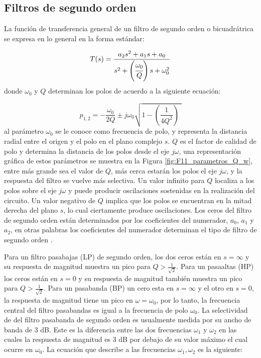 		\subsection{Filtros de segundo orden}
	
	La función de transferencia general de un filtro de segundo orden o bicuadrátrica se expresa en lo general en la forma estándar:
	
	\begin{equation}
		T(s) = \frac{a_{2} s^{2} + a_{1}s + a_{0}}{s^{2} + \left( \cfrac{ \omega_{0} }{Q} \right)s + \omega_{0}^{2}}
	\end{equation}
	donde $\omega_{0}$ y $Q$ determinan los polos de acuerdo a la siguiente ecuación:
	
	\begin{equation}
		p_{1,2} = - \frac{\omega_{0}}{2 Q} \pm j \omega_{0} \sqrt{1 - \left(   \frac{1}{4 Q^{2}}  \right) \,\,}
	\end{equation}
	al parámetro $\omega_{0}$ se le conoce como frecuencia de polo, y representa la distancia radial entre el origen y el polo en el plano complejo $s$. $Q$ es el factor de calidad de polo y determina la distancia de los polos desde el eje $j\omega$, una representación gráfica de estos parámetros se muestra en la Figura \ref{fig:F11_parametros_Q_w}, entre más grande sea el valor de $Q$, más cerca estarán los polos el eje $j\omega$, y la respuesta del filtro se vuelve más selectiva. Un valor infinito para $Q$ localiza a los polos sobre el eje $j\omega$ y puede producir oscilaciones sostenidas en la realización del circuito. Un valor negativo de $Q$ implica que los polos se encuentran en la mitad derecha del plano $s$, lo cual ciertamente produce oscilaciones.
	Los ceros del filtro de segundo orden están determinados por los coeficientes del numerador, $a_{0}$, $a_{1}$ y $a_{2}$, en otras palabras los coeficientes del numerador determinan el tipo de filtro de segundo orden \cite{Sedra2015}.
	
	Para un filtro pasabajas (LP) de segundo orden, los dos ceros están en $s = \infty$ y su respuesta de magnitud muestra un pico para $Q > \frac{1}{\sqrt{2}}$. Para un pasaaltas (HP) los ceros están en $s = 0$ y su respuesta de magnitud también muestra un pico para $Q > \frac{1}{\sqrt{2}}$. Para un pasabanda (BP) un cero esta en $s = \infty$ y el otro en $s = 0$, la respuesta de magnitud tiene un pico en $\omega = \omega_{0}$, por lo tanto, la frecuencia central del filtro pasabandas es igual a la frecuencia de polo $\omega_{0}$. La selectividad de del filtro pasabanda de segundo orden es usualmente medida por su ancho de banda de 3 dB. Este es la diferencia entre las dos frecuencias $\omega_{1}$ y $\omega_{2}$ en las cuales la respuesta de magnitud es 3 dB por debajo de su valor máximo el cual ocurre en $\omega_{0}$. La ecuación que describe a las frecuencias $\omega_{1},\omega_{2}$ es la siguiente:
	
